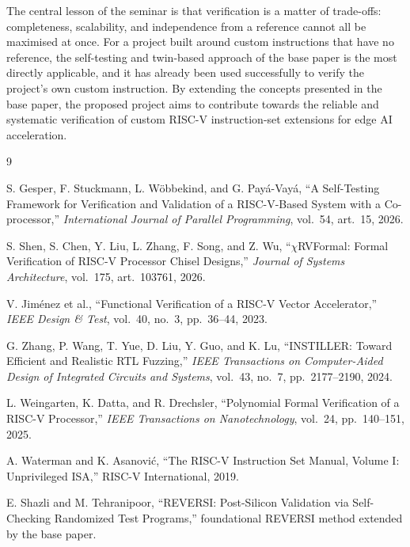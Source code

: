 \documentclass[12pt,a4paper]{report}
\begin{document}
The central lesson of the seminar is that verification is a matter of trade-offs:
completeness, scalability, and independence from a reference cannot all be maximised at
once. For a project built around custom instructions that have no reference, the
self-testing and twin-based approach of the base paper is the most directly applicable, and
it has already been used successfully to verify the project's own custom instruction. By
extending the concepts presented in the base paper, the proposed project aims to contribute
towards the reliable and systematic verification of custom RISC-V instruction-set
extensions for edge AI acceleration.

\begin{thebibliography}{9}

 S. Gesper, F. Stuckmann, L. W\"obbekind, and G. Pay\'a-Vay\'a,
``A Self-Testing Framework for Verification and Validation of a RISC-V-Based System with a
Co-processor,'' \textit{International Journal of Parallel Programming}, vol.~54, art.~15,
2026.

 S. Shen, S. Chen, Y. Liu, L. Zhang, F. Song, and Z. Wu,
``$\chi$RVFormal: Formal Verification of RISC-V Processor Chisel Designs,''
\textit{Journal of Systems Architecture}, vol.~175, art.~103761, 2026.

 V. Jim\'enez et al., ``Functional Verification of a RISC-V Vector
Accelerator,'' \textit{IEEE Design \& Test}, vol.~40, no.~3, pp.~36--44, 2023.

 G. Zhang, P. Wang, T. Yue, D. Liu, Y. Guo, and K. Lu,
``INSTILLER: Toward Efficient and Realistic RTL Fuzzing,'' \textit{IEEE Transactions on
Computer-Aided Design of Integrated Circuits and Systems}, vol.~43, no.~7, pp.~2177--2190,
2024.

 L. Weingarten, K. Datta, and R. Drechsler, ``Polynomial Formal Verification
of a RISC-V Processor,'' \textit{IEEE Transactions on Nanotechnology}, vol.~24,
pp.~140--151, 2025.

 A. Waterman and K. Asanovi\'c, ``The RISC-V Instruction Set Manual,
Volume I: Unprivileged ISA,'' RISC-V International, 2019.

 E. Shazli and M. Tehranipoor, ``REVERSI: Post-Silicon Validation via
Self-Checking Randomized Test Programs,'' foundational REVERSI method extended by the base
paper.

\end{thebibliography}
\end{document}
